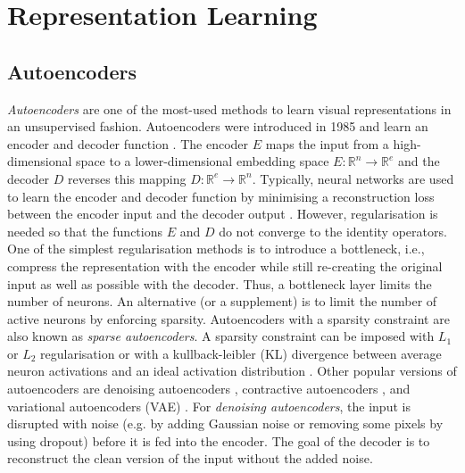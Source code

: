 \section{Representation Learning}

\subsection{Autoencoders}
\emph{Autoencoders} are one of the most-used methods to learn visual representations in an unsupervised fashion.
Autoencoders were introduced in 1985  and learn an encoder and decoder function .
The encoder $E$ maps the input from a high-dimensional space to a lower-dimensional embedding space $E: \mathbb{R}^{n} \rightarrow \mathbb{R}^{e}$ and the decoder $D$ reverses this mapping $D: \mathbb{R}^{e} \rightarrow \mathbb{R}^{n}$.
Typically, neural networks are used to learn the encoder and decoder function by minimising a reconstruction loss between the encoder input and the decoder output .
However, regularisation is needed so that the functions $E$ and $D$ do not converge to the identity operators.
One of the simplest regularisation methods is to introduce a bottleneck, i.e., compress the representation with the encoder while still re-creating the original input as well as possible with the decoder.
Thus, a bottleneck layer limits the number of neurons.
An alternative (or a supplement) is to limit the number of active neurons by enforcing sparsity.
Autoencoders with a sparsity constraint are also known as \emph{sparse autoencoders}.
A sparsity constraint can be imposed with $L_1$ or $L_2$ regularisation or with a kullback-leibler (KL) divergence between average neuron activations and an ideal activation distribution .
Other popular versions of autoencoders are denoising autoencoders , contractive autoencoders , and variational autoencoders (VAE) .
For \emph{denoising autoencoders}, the input is disrupted with noise (e.g. by adding Gaussian noise or removing some pixels by using dropout) before it is fed into the encoder.
The goal of the decoder is to reconstruct the clean version of the input without the added noise.
